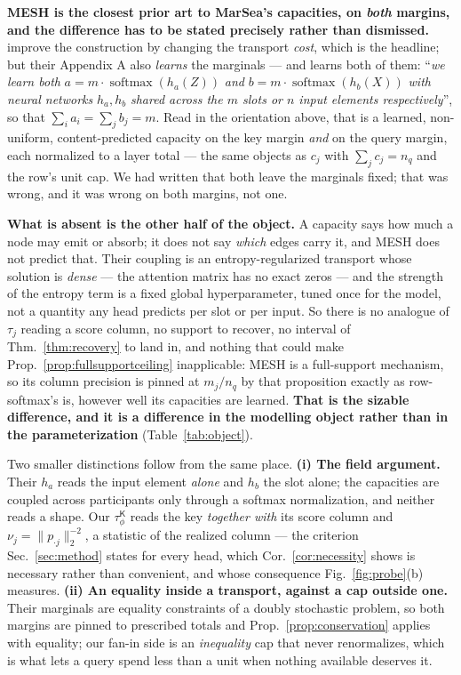 \documentclass{article}
\newcommand{\softmaxop}{\operatorname{softmax}}
\newcommand{\tauK}{\tau^{\mathsf{K}}_\phi}
\begin{document}
\textbf{MESH is the closest prior art to MarSea's capacities, on \emph{both} margins, and the
difference has to be stated precisely rather than dismissed.} \citet{zhang2023mesh} improve the
construction by changing the transport \emph{cost}, which is the headline; but their Appendix A
also \emph{learns} the marginals --- and learns both of them: ``\emph{we learn both}
$a = m\cdot\softmaxop(h_a(Z))$ \emph{and} $b = m\cdot\softmaxop(h_b(X))$ \emph{with neural
networks} $h_a,h_b$ \emph{shared across the $m$ slots or $n$ input elements respectively}'', so
that $\sum_i a_i=\sum_j b_j=m$. Read in the orientation above, that is a learned, non-uniform,
content-predicted capacity on the key margin \emph{and} on the query margin, each normalized to a
layer total --- the same objects as $c_j$ with $\sum_j c_j=n_q$ and the row's unit cap. We had
written that both leave the marginals fixed; that was wrong, and it was wrong on both margins,
not one.

\textbf{What is absent is the other half of the object.} A capacity says how much a node may
emit or absorb; it does not say \emph{which} edges carry it, and MESH does not predict that.
Their coupling is an entropy-regularized transport whose solution is \emph{dense} --- the
attention matrix has no exact zeros --- and the strength of the entropy term is a fixed global
hyperparameter, tuned once for the model, not a quantity any head predicts per slot or per input.
So there is no analogue of $\tau_j$ reading a score column, no support to recover, no interval of
Thm.~\ref{thm:recovery} to land in, and nothing that could make Prop.~\ref{prop:fullsupportceiling}
inapplicable: MESH is a full-support mechanism, so its column precision is pinned at $m_j/n_q$ by
that proposition exactly as row-softmax's is, however well its capacities are learned.
\textbf{That is the sizable difference, and it is a difference in the modelling object rather than
in the parameterization} (Table~\ref{tab:object}).

Two smaller distinctions follow from the same place. \textbf{(i) The field argument.} Their $h_a$
reads the input element \emph{alone} and $h_b$ the slot alone; the capacities are coupled across
participants only through a softmax normalization, and neither reads a shape. Our $\tauK$ reads
the key \emph{together with} its score column and $\nu_j = \|p_{\cdot j}\|_2^{-2}$, a statistic of
the realized column --- the criterion Sec.~\ref{sec:method} states for every head, which
Cor.~\ref{cor:necessity} shows is necessary rather than convenient, and whose consequence
Fig.~\ref{fig:probe}(b) measures. \textbf{(ii) An equality inside a transport, against a cap outside one.} Their marginals
are equality constraints of a doubly stochastic problem, so both margins are pinned to prescribed
totals and Prop.~\ref{prop:conservation} applies with equality; our fan-in side is an
\emph{inequality} cap that never renormalizes, which is what lets a query spend less than a unit
when nothing available deserves it.
\end{document}
